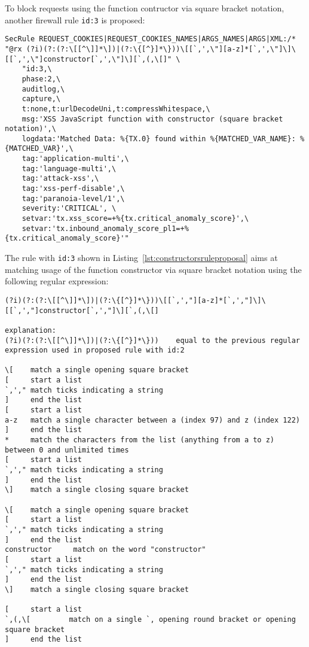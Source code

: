 To block requests using the function contructor via square bracket notation, another firewall rule \verb|id:3| is proposed:

\begin{lstlisting}[style=basicStyle, caption=rule proposal to block usage of function constructor via square bracket notation, label={lst:constructorsruleproposalB}]
SecRule REQUEST_COOKIES|REQUEST_COOKIES_NAMES|ARGS_NAMES|ARGS|XML:/* "@rx (?i)(?:(?:\[[^\]]*\])|(?:\{[^}]*\}))\[[`,',\"][a-z]*[`,',\"]\]\[[`,',\"]constructor[`,',\"]\][`,(,\[]" \
    "id:3,\
    phase:2,\
    auditlog,\
    capture,\
    t:none,t:urlDecodeUni,t:compressWhitespace,\
    msg:'XSS JavaScript function with constructor (square bracket notation)',\
    logdata:'Matched Data: %{TX.0} found within %{MATCHED_VAR_NAME}: %{MATCHED_VAR}',\
    tag:'application-multi',\
    tag:'language-multi',\
    tag:'attack-xss',\
    tag:'xss-perf-disable',\
    tag:'paranoia-level/1',\
    severity:'CRITICAL', \
    setvar:'tx.xss_score=+%{tx.critical_anomaly_score}',\
    setvar:'tx.inbound_anomaly_score_pl1=+%{tx.critical_anomaly_score}'"
\end{lstlisting}

The rule with \verb|id:3| shown in Listing~\ref{lst:constructorsruleproposal} aims at matching usage of the function constructor via square bracket notation using the following regular expression:

\begin{lstlisting}[style=basicStyle, caption=regex of proposed rule id:2, label={lst:constructorsruleproposalregexB}]
(?i)(?:(?:\[[^\]]*\])|(?:\{[^}]*\}))\[[`,',"][a-z]*[`,',"]\]\[[`,',"]constructor[`,',"]\][`,(,\[]

explanation:
(?i)(?:(?:\[[^\]]*\])|(?:\{[^}]*\}))    equal to the previous regular expression used in proposed rule with id:2

\[    match a single opening square bracket
[     start a list
`,'," match ticks indicating a string
]     end the list
[     start a list
a-z   match a single character between a (index 97) and z (index 122)
]     end the list
*     match the characters from the list (anything from a to z) between 0 and unlimited times
[     start a list
`,'," match ticks indicating a string
]     end the list
\]    match a single closing square bracket

\[    match a single opening square bracket
[     start a list
`,'," match ticks indicating a string
]     end the list
constructor     match on the word "constructor"
[     start a list
`,'," match ticks indicating a string
]     end the list
\]    match a single closing square bracket

[     start a list
`,(,\[         match on a single `, opening round bracket or opening square bracket
]     end the list
\end{lstlisting}

